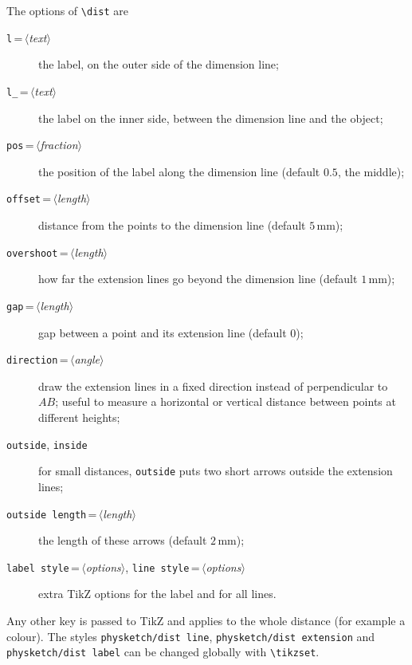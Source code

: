 \documentclass[a4paper,11pt]{article}
\newcommand\cs[1]{\texttt{\textbackslash#1}}
\newcommand\key[1]{\texttt{#1}}
\newcommand\meta[1]{\ensuremath{\langle}\textit{#1}\ensuremath{\rangle}}
\begin{document}
The options of \cs{dist} are
\begin{description}
  \item[\key{l}\,=\,\meta{text}] the label, on the outer side of the
    dimension line;
  \item[\key{l\_}\,=\,\meta{text}] the label on the inner side, between the
    dimension line and the object;
  \item[\key{pos}\,=\,\meta{fraction}] the position of the label along the
    dimension line (default \(0.5\), the middle);
  \item[\key{offset}\,=\,\meta{length}] distance from the points to the
    dimension line (default \(5\,\mathrm{mm}\));
  \item[\key{overshoot}\,=\,\meta{length}] how far the extension lines go
    beyond the dimension line (default \(1\,\mathrm{mm}\));
  \item[\key{gap}\,=\,\meta{length}] gap between a point and its extension
    line (default \(0\));
  \item[\key{direction}\,=\,\meta{angle}] draw the extension lines in a fixed
    direction instead of perpendicular to \(AB\); useful to measure a
    horizontal or vertical distance between points at different heights;
  \item[\key{outside}, \key{inside}] for small distances, \key{outside} puts
    two short arrows outside the extension lines;
  \item[\key{outside length}\,=\,\meta{length}] the length of these arrows
    (default \(2\,\mathrm{mm}\));
  \item[\key{label style}\,=\,\meta{options}, \key{line style}\,=\,\meta{options}]
    extra TikZ options for the label and for all lines.
\end{description}
Any other key is passed to TikZ and applies to the whole distance (for
example a colour). The styles \texttt{physketch/dist line},
\texttt{physketch/dist extension} and \texttt{physketch/dist label} can be
changed globally with \cs{tikzset}.

\begin{example}
\end{example}
\end{document}
